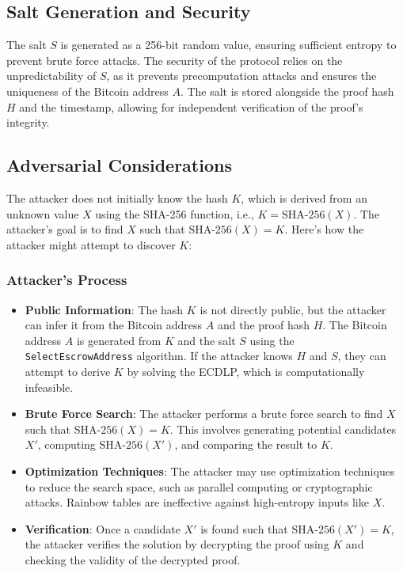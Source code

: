 \documentclass[12pt]{report}
\begin{document}
\subsection{Salt Generation and Security}
The salt \( S \) is generated as a 256-bit random value, ensuring sufficient entropy to prevent brute force attacks. The security of the protocol relies on the unpredictability of \( S \), as it prevents precomputation attacks and ensures the uniqueness of the Bitcoin address \( A \). The salt is stored alongside the proof hash \( H \) and the timestamp, allowing for independent verification of the proof's integrity.

\subsection{Adversarial Considerations}

The attacker does not initially know the hash \( K \), which is derived from an unknown value \( X \) using the SHA-256 function, i.e., \( K = \text{SHA-256}(X) \). The attacker's goal is to find \( X \) such that \( \text{SHA-256}(X) = K \). Here's how the attacker might attempt to discover \( K \):

\subsubsection{Attacker's Process}
\begin{itemize}
    \item \textbf{Public Information}: The hash \( K \) is not directly public, but the attacker can infer it from the Bitcoin address \( A \) and the proof hash \( H \). The Bitcoin address \( A \) is generated from \( K \) and the salt \( S \) using the \texttt{SelectEscrowAddress} algorithm. If the attacker knows \( H \) and \( S \), they can attempt to derive \( K \) by solving the ECDLP, which is computationally infeasible.
    \item \textbf{Brute Force Search}: The attacker performs a brute force search to find \( X \) such that \( \text{SHA-256}(X) = K \). This involves generating potential candidates \( X' \), computing \( \text{SHA-256}(X') \), and comparing the result to \( K \).
    \item \textbf{Optimization Techniques}: The attacker may use optimization techniques to reduce the search space, such as parallel computing or cryptographic attacks. Rainbow tables are ineffective against high-entropy inputs like \( X \).
    \item \textbf{Verification}: Once a candidate \( X' \) is found such that \( \text{SHA-256}(X') = K \), the attacker verifies the solution by decrypting the proof using \( K \) and checking the validity of the decrypted proof.
\end{itemize}
\end{document}
